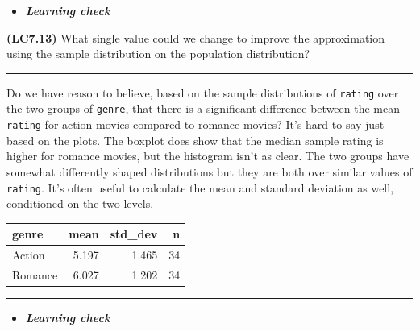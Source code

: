 \documentclass[]{tufte-book}
\newenvironment{Shaded}{\begin{snugshade}}{\end{snugshade}}
\newcommand{\KeywordTok}[1]{\textcolor[rgb]{0.13,0.29,0.53}{\textbf{{#1}}}}
\newcommand{\DataTypeTok}[1]{\textcolor[rgb]{0.13,0.29,0.53}{{#1}}}
\newcommand{\StringTok}[1]{\textcolor[rgb]{0.31,0.60,0.02}{{#1}}}
\newcommand{\NormalTok}[1]{{#1}}
\let\oldrule=\rule
\renewcommand{\rule}[1]{\oldrule{\linewidth}}
\newenvironment{rmdblock}[1]
  {\begin{shaded*}
  \begin{itemize}
  \renewcommand{\labelitemi}{
    \raisebox{-.7\height}[0pt][0pt]{
    }
  }
  \item
  }
  {
  \end{itemize}
  \end{shaded*}
  }
\newenvironment{learncheck}
  {\begin{rmdblock}{warning}}
  {\end{rmdblock}}
\begin{document}
\begin{learncheck}
\textbf{\emph{Learning check}}
\end{learncheck}

\textbf{(LC7.13)} What single value could we change to improve the
approximation using the sample distribution on the population
distribution?

\begin{center}\rule{0.5\linewidth}{\linethickness}\end{center}

Do we have reason to believe, based on the sample distributions of
\texttt{rating} over the two groups of \texttt{genre}, that there is a
significant difference between the mean \texttt{rating} for action
movies compared to romance movies? It's hard to say just based on the
plots. The boxplot does show that the median sample rating is higher for
romance movies, but the histogram isn't as clear. The two groups have
somewhat differently shaped distributions but they are both over similar
values of \texttt{rating}. It's often useful to calculate the mean and
standard deviation as well, conditioned on the two levels.

\begin{Shaded}
\end{Shaded}

\begin{tabular}{l|r|r|r}
\hline
genre & mean & std\_dev & n\\
\hline
Action & 5.197 & 1.465 & 34\\
\hline
Romance & 6.027 & 1.202 & 34\\
\hline
\end{tabular}

\begin{center}\rule{0.5\linewidth}{\linethickness}\end{center}

\begin{learncheck}
\textbf{\emph{Learning check}}
\end{learncheck}
\end{document}
